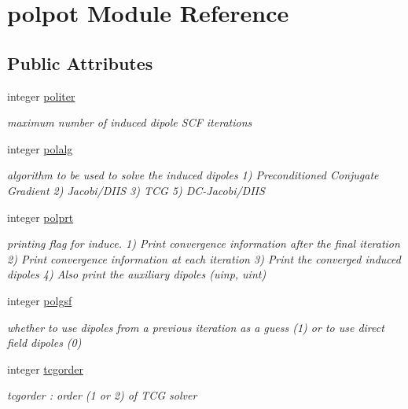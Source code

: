 \hypertarget{classpolpot}{\section{polpot Module Reference}
\label{classpolpot}
}
\subsection*{Public Attributes}
\begin{DoxyCompactItemize}
\item 
integer \hyperlink{classpolpot_a2f2e089f358cca82ea56802e31055b19}{politer}
\begin{DoxyCompactList}\small\item\em maximum number of induced dipole S\-C\-F iterations \end{DoxyCompactList}\item 
integer \hyperlink{classpolpot_a89d0f4d40cd0dbced9858fee7c3ad13b}{polalg}
\begin{DoxyCompactList}\small\item\em algorithm to be used to solve the induced dipoles 1) Preconditioned Conjugate Gradient 2) Jacobi/\-D\-I\-I\-S 3) T\-C\-G 5) D\-C-\/\-Jacobi/\-D\-I\-I\-S \end{DoxyCompactList}\item 
integer \hyperlink{classpolpot_a1aa897b603b5d8dfe804e35c572d9994}{polprt}
\begin{DoxyCompactList}\small\item\em printing flag for induce. 1) Print convergence information after the final iteration 2) Print convergence information at each iteration 3) Print the converged induced dipoles 4) Also print the auxiliary dipoles (uinp, uint) \end{DoxyCompactList}\item 
integer \hyperlink{classpolpot_a238b33cf218bd1e049b7a88b714f9861}{polgsf}
\begin{DoxyCompactList}\small\item\em whether to use dipoles from a previous iteration as a guess (1) or to use direct field dipoles (0) \end{DoxyCompactList}\item 
integer \hyperlink{classpolpot_ad3b3a2ad74be9d5a62eda7d1ac6445b9}{tcgorder}
\begin{DoxyCompactList}\small\item\em tcgorder \-: order (1 or 2) of T\-C\-G solver \end{DoxyCompactList}\item 

\end{DoxyCompactItemize}
